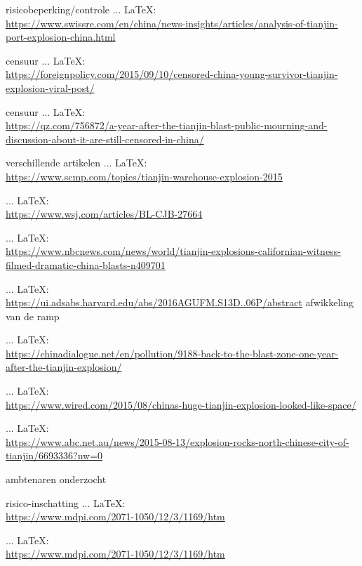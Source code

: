 \begin{thebibliography}{99}
{{{{				risicobeperking/controle
				 ... \LaTeX:\\ \url{https://www.swissre.com/en/china/news-insights/articles/analysis-of-tianjin-port-explosion-china.html}
				
				censuur
				 ... \LaTeX:\\ \url{https://foreignpolicy.com/2015/09/10/censored-china-young-survivor-tianjin-explosion-viral-post/}
				
				censuur
				 ... \LaTeX:\\ \url{https://qz.com/756872/a-year-after-the-tianjin-blast-public-mourning-and-discussion-about-it-are-still-censored-in-china/}
				
				verschillende artikelen
				 ... \LaTeX:\\ \url{https://www.scmp.com/topics/tianjin-warehouse-explosion-2015}
				
				 ... \LaTeX:\\ \url{https://www.wsj.com/articles/BL-CJB-27664}
				
				 ... \LaTeX:\\ \url{https://www.nbcnews.com/news/world/tianjin-explosions-californian-witness-filmed-dramatic-china-blasts-n409701}
				
				 ... \LaTeX:\\ \url{https://ui.adsabs.harvard.edu/abs/2016AGUFM.S13D..06P/abstract}
				afwikkeling van de ramp
				
				 ... \LaTeX:\\ \url{https://chinadialogue.net/en/pollution/9188-back-to-the-blast-zone-one-year-after-the-tianjin-explosion/}
				
				 ... \LaTeX:\\ \url{https://www.wired.com/2015/08/chinas-huge-tianjin-explosion-looked-like-space/}
				
				 ... \LaTeX:\\ \url{https://www.abc.net.au/news/2015-08-13/explosion-rocks-north-chinese-city-of-tianjin/6693336?nw=0}
				
				ambtenaren onderzocht
				
				risico-inschatting
				 ... \LaTeX:\\ \url{https://www.mdpi.com/2071-1050/12/3/1169/htm}
				
				 ... \LaTeX:\\ \url{https://www.mdpi.com/2071-1050/12/3/1169/htm}
				
}}}}
\end{thebibliography}
